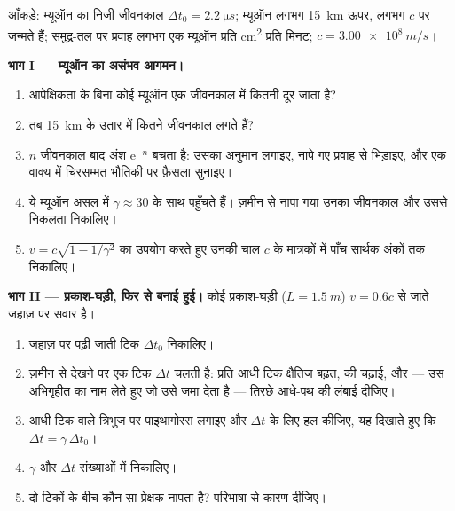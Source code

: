 \begin{problem}
\label{pb:g12:special-relativity:1}
आँकड़े: म्यूऑन का निजी जीवनकाल $\Delta t_0 = \qty{2.2}{\micro s}$; म्यूऑन लगभग \qty{15}{km} ऊपर, लगभग $c$
पर जन्मते हैं; समुद्र-तल पर प्रवाह लगभग एक म्यूऑन प्रति \unit{cm^2} प्रति मिनट;
$c = \qty{3.00e8}{m/s}$।

\medskip
\noindent\textbf{भाग I --- म्यूऑन का असंभव आगमन।}
\begin{enumerate}
  \item आपेक्षिकता के बिना कोई म्यूऑन एक जीवनकाल में कितनी दूर जाता है?
  \item तब \qty{15}{km} के उतार में कितने जीवनकाल लगते हैं?
  \item $n$ जीवनकाल बाद अंश $\mathrm{e}^{-n}$ बचता है: उसका अनुमान लगाइए, नापे गए
        प्रवाह से भिड़ाइए, और एक वाक्य में चिरसम्मत भौतिकी पर फ़ैसला सुनाइए।
  \item ये म्यूऑन असल में $\gamma \approx 30$ के साथ पहुँचते हैं। ज़मीन से नापा गया उनका
        जीवनकाल और उससे निकलता  निकालिए।
  \item $v = c\sqrt{1 - 1/\gamma^2}$ का उपयोग करते हुए उनकी चाल $c$ के मात्रकों में
        पाँच सार्थक अंकों तक निकालिए।
\end{enumerate}

\medskip
\noindent\textbf{भाग II --- प्रकाश-घड़ी, फिर से बनाई हुई।}
कोई प्रकाश-घड़ी ($L = \qty{1.5}{m}$) $v = 0.6c$ से जाते जहाज़ पर सवार है।
\begin{enumerate}[resume]
  \item जहाज़ पर पढ़ी जाती टिक $\Delta t_0$ निकालिए।
  \item ज़मीन से देखने पर एक टिक $\Delta t$ चलती है: प्रति आधी टिक क्षैतिज बढ़त,
         की  चढ़ाई, और --- उस अभिगृहीत का नाम लेते हुए
        जो उसे जमा देता है --- तिरछे आधे-पथ की लंबाई दीजिए।
  \item आधी टिक वाले त्रिभुज पर पाइथागोरस लगाइए और $\Delta t$ के लिए हल कीजिए,
        यह दिखाते हुए कि $\Delta t = \gamma\,\Delta t_0$।
  \item $\gamma$ और $\Delta t$ संख्याओं में निकालिए।
  \item दो टिकों के बीच  कौन-सा प्रेक्षक नापता है? परिभाषा से
        कारण दीजिए।
\end{enumerate}


\end{problem}
